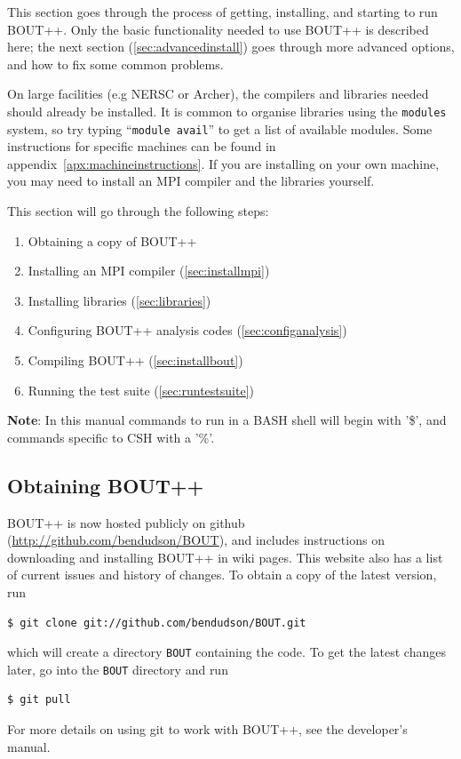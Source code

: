 \documentclass[12pt]{article}
\begin{document}
This section goes through the process of getting, installing, and
starting to run BOUT++. Only the basic functionality needed to use BOUT++
is described here; the next section (\ref{sec:advancedinstall}) goes through
more advanced options, and how to fix some common problems. 

On large facilities (e.g NERSC or Archer), the compilers and libraries
needed should already be installed. It is common to organise libraries
using the \texttt{modules} system, so try typing ``\texttt{module avail}'' to
get a list of available modules. Some instructions for specific machines
can be found in appendix~\ref{apx:machineinstructions}.
If you are installing on your own machine, you may need to install an MPI compiler
and the libraries yourself.

This section will go through the following steps:
\begin{enumerate}
\item Obtaining a copy of BOUT++
\item Installing an MPI compiler (\ref{sec:installmpi})
\item Installing libraries (\ref{sec:libraries})
\item Configuring BOUT++ analysis codes (\ref{sec:configanalysis})
\item Compiling BOUT++ (\ref{sec:installbout})
\item Running the test suite (\ref{sec:runtestsuite})
\end{enumerate}

{\bf Note}: In this manual commands to run in a BASH shell will begin with '\$', and commands specific to CSH with a '\%'.

\subsection{Obtaining BOUT++}

BOUT++ is now hosted publicly on github (\url{http://github.com/bendudson/BOUT}), and includes
instructions on downloading and installing BOUT++ in wiki pages. This website also has a list of current  issues
and history of changes. To obtain a copy of the latest version, run 
\begin{verbatim}
$ git clone git://github.com/bendudson/BOUT.git
\end{verbatim}
which will create a directory \texttt{BOUT} containing the code. To get the latest changes later,
go into the  \texttt{BOUT} directory and run
\begin{verbatim}
$ git pull
\end{verbatim}
For more details on using git to work with BOUT++, see the developer's manual.
\end{document}
